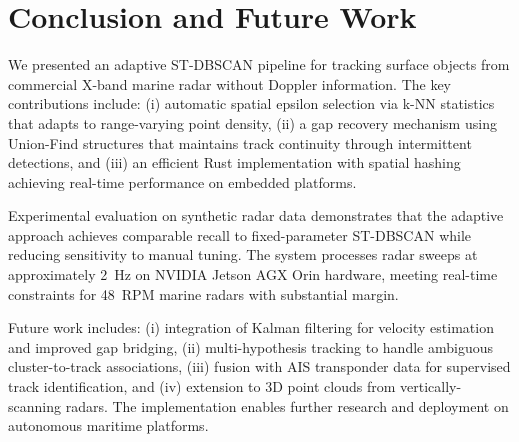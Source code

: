 \documentclass[conf]{new-aiaa}
\begin{document}
\section{Conclusion and Future Work}

We presented an adaptive ST-DBSCAN pipeline for tracking surface objects from commercial X-band marine radar without Doppler information. The key contributions include: (i) automatic spatial epsilon selection via k-NN statistics that adapts to range-varying point density, (ii) a gap recovery mechanism using Union-Find structures that maintains track continuity through intermittent detections, and (iii) an efficient Rust implementation with spatial hashing achieving real-time performance on embedded platforms.

Experimental evaluation on synthetic radar data demonstrates that the adaptive approach achieves comparable recall to fixed-parameter ST-DBSCAN while reducing sensitivity to manual tuning. The system processes radar sweeps at approximately 2~Hz on NVIDIA Jetson AGX Orin hardware, meeting real-time constraints for 48~RPM marine radars with substantial margin.

Future work includes: (i) integration of Kalman filtering for velocity estimation and improved gap bridging, (ii) multi-hypothesis tracking to handle ambiguous cluster-to-track associations, (iii) fusion with AIS transponder data for supervised track identification, and (iv) extension to 3D point clouds from vertically-scanning radars. The implementation enables further research and deployment on autonomous maritime platforms.


\end{document}
